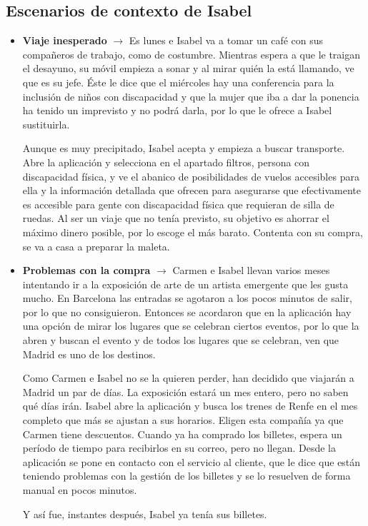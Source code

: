 \subsection{Escenarios de contexto de Isabel}
\begin{itemize}
    \item \textbf{Viaje inesperado} $\rightarrow$ Es lunes e Isabel va a tomar un café con sus compañeros de trabajo, como de costumbre. Mientras espera a que le traigan el desayuno, su móvil empieza a sonar y al mirar quién la está llamando, ve que es su jefe. Éste le dice que el miércoles hay una conferencia para la inclusión de niños con discapacidad y que la mujer que iba a dar la ponencia ha tenido un imprevisto y no podrá darla, por lo que le ofrece a Isabel sustituirla.

    Aunque es muy precipitado, Isabel acepta y empieza a buscar transporte. Abre la aplicación y selecciona en el apartado filtros, persona con discapacidad física, y ve el abanico de posibilidades de vuelos accesibles para ella y la información detallada que ofrecen para asegurarse que efectivamente es accesible para gente con discapacidad física que requieran de silla de ruedas. Al ser un viaje que no tenía previsto, su objetivo es ahorrar el máximo dinero posible, por lo escoge el más barato. Contenta con su compra, se va a casa a preparar la maleta.
    
    \item \textbf{Problemas con la compra} $\rightarrow$ Carmen e Isabel llevan varios meses intentando ir a la exposición de arte de un artista emergente que les gusta mucho. En Barcelona las entradas se agotaron a los pocos minutos de salir, por lo que no consiguieron. Entonces se acordaron que en la aplicación hay una opción de mirar los lugares que se celebran ciertos eventos, por lo que la abren y buscan el evento y de todos los lugares que se celebran, ven que Madrid es uno de los destinos.

    Como Carmen e Isabel no se la quieren perder, han decidido que viajarán a Madrid un par de días. La exposición estará un mes entero, pero no saben qué días irán.
    Isabel abre la aplicación y busca los trenes de Renfe en el mes completo que más se ajustan a sus horarios. Eligen esta compañía ya que Carmen tiene descuentos. Cuando ya ha comprado los billetes, espera un período de tiempo para recibirlos en su correo, pero no llegan. Desde la aplicación se pone en contacto con el servicio al cliente, que le dice que están teniendo problemas con la gestión de los billetes y se lo resuelven de forma manual en pocos minutos. 
    
    Y así fue, instantes después, Isabel ya tenía sus billetes.
    
\end{itemize}

